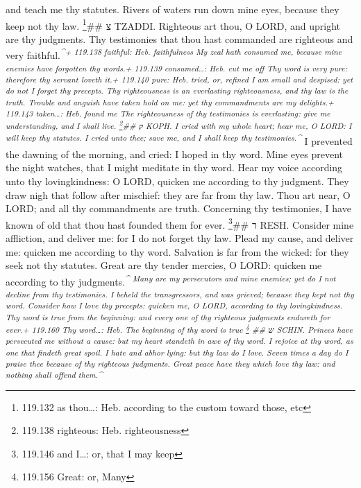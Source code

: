 and teach me thy statutes.  Rivers of waters run down mine
eyes, because they keep not thy law. \footnote{119.132 as thou\ldots:
  Heb. according to the custom toward those, etc}\#\# צ TZADDI.
 Righteous art thou, O LORD, and upright are thy
judgments.  Thy testimonies that thou hast commanded are
righteous and very faithful.\textsuperscript{\emph{\^{}+ 119.138
faithful: Heb. faithfulness  My zeal hath consumed me,
because mine enemies have forgotten thy words.+ 119.139 consumed\ldots:
Heb. cut me off  Thy word is very pure: therefore thy
servant loveth it.+ 119.140 pure: Heb. tried, or, refined 
I am small and despised: yet do not I forget thy precepts.
 Thy righteousness is an everlasting righteousness, and
thy law is the truth.  Trouble and anguish have taken hold
on me: yet thy commandments are my delights.+ 119.143 taken\ldots: Heb.
found me  The righteousness of thy testimonies is
everlasting: give me understanding, and I shall live. \footnote{119.138
  righteous: Heb. righteousness}\#\# ק KOPH.  I cried with
my whole heart; hear me, O LORD: I will keep thy statutes.
 I cried unto thee; save me, and I shall keep thy
testimonies.\^{}}}  I prevented the dawning of the
morning, and cried: I hoped in thy word.  Mine eyes
prevent the night watches, that I might meditate in thy word.
 Hear my voice according unto thy lovingkindness: O LORD,
quicken me according to thy judgment.  They draw nigh that
follow after mischief: they are far from thy law.  Thou
art near, O LORD; and all thy commandments are truth. 
Concerning thy testimonies, I have known of old that thou hast founded
them for ever. \footnote{119.146 and I\ldots: or, that I may keep}\#\# ר
RESH.  Consider mine affliction, and deliver me: for I do
not forget thy law.  Plead my cause, and deliver me:
quicken me according to thy word.  Salvation is far from
the wicked: for they seek not thy statutes.  Great are thy
tender mercies, O LORD: quicken me according to thy
judgments.\textsuperscript{\emph{\^{}  Many are my
persecutors and mine enemies; yet do I not decline from thy testimonies.
 I beheld the transgressors, and was grieved; because they
kept not thy word.  Consider how I love thy precepts:
quicken me, O LORD, according to thy lovingkindness.  Thy
word is true from the beginning: and every one of thy righteous
judgments endureth for ever.+ 119.160 Thy word\ldots: Heb. The beginning
of thy word is true \footnote{119.156 Great: or, Many} \#\# ש SCHIN.
 Princes have persecuted me without a cause: but my heart
standeth in awe of thy word.  I rejoice at thy word, as
one that findeth great spoil.  I hate and abhor lying: but
thy law do I love.  Seven times a day do I praise thee
because of thy righteous judgments.  Great peace have they
which love thy law: and nothing shall offend them.\^{}}} 
